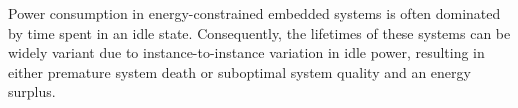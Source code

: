 Power consumption in energy-constrained embedded systems is often dominated by time spent in an idle state.  Consequently, the lifetimes of these systems can be widely variant due to instance-to-instance variation in idle power, resulting in either premature system death or suboptimal system quality and an energy surplus. 




